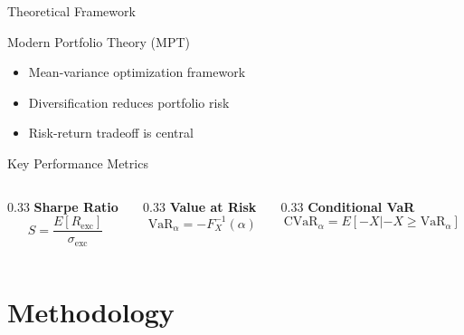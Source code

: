 \documentclass[12pt, aspectratio=43]{beamer}
\begin{document}
	\begin{frame}{Theoretical Framework}
		\begin{block}{Modern Portfolio Theory (MPT)}
			\begin{itemize}
				\item Mean-variance optimization framework
				\item Diversification reduces portfolio risk
				\item Risk-return tradeoff is central
			\end{itemize}
		\end{block}
		
		\vspace{1em}
		
		\begin{block}{Key Performance Metrics}
			\centering
			\small
			\begin{columns}[T]
				\hspace{-4em} %
				\begin{column}{0.33\textwidth}
					\centering
					\textbf{Sharpe Ratio}
					\footnotesize
					\[
					S = \frac{E[R_{\text{exc}}]}{\sigma_{\text{exc}}}
					\]
				\end{column}
				\hspace{-7em} %
				\begin{column}{0.33\textwidth}
					\centering
					\textbf{Value at Risk}
					\footnotesize
					\[
					\text{VaR}_\alpha = -F_X^{-1}(\alpha)
					\]
				\end{column}
				\hspace{-5em} %
				\begin{column}{0.33\textwidth}
					\centering
					\textbf{Conditional VaR}
					\footnotesize
					\[
					\text{CVaR}_\alpha = E[-X| -X \geq \text{VaR}_{\alpha}]
					\]
				\end{column}
			\end{columns}
		\end{block}
	\end{frame}
	
	\section{Methodology}
	
\end{document}
